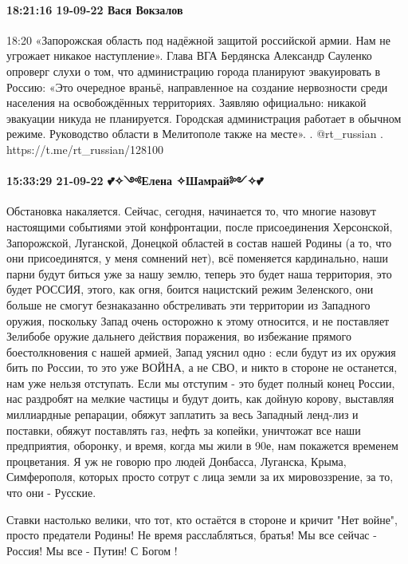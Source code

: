 \paragraph{18:21:16 19-09-22 Вася Вокзалов}
18:20
«Запорожская область под надёжной защитой российской армии. Нам не угрожает никакое наступление».
Глава ВГА Бердянска Александр Сауленко опроверг слухи о том, что администрацию города планируют эвакуировать в Россию:
«Это очередное враньё, направленное на создание нервозности среди населения на освобождённых территориях. Заявляю официально: никакой эвакуации никуда не планируется. Городская администрация работает в обычном режиме. Руководство области в Мелитополе также на месте».
.
@rt_russian
.
https://t.me/rt_russian/128100


\paragraph{15:33:29 21-09-22 💕✧༺Елена ✧Шамрай༻✧💕}

Обстановка накаляется. Сейчас, сегодня, начинается то, что многие назовут
настоящими событиями этой конфронтации, после присоединения Херсонской,
Запорожской, Луганской, Донецкой областей в состав нашей Родины (а то, что они
присоединятся, у меня сомнений нет), всё поменяется кардинально, наши парни
будут биться уже за нашу землю, теперь это будет наша территория, это будет
РОССИЯ, этого, как огня, боится нацистский режим Зеленского, они больше не
смогут безнаказанно обстреливать эти территории из Западного оружия, поскольку
Запад очень осторожно к этому относится, и не поставляет Зелибобе оружие
дальнего действия поражения, во избежание прямого боестолкновения с нашей
армией, Запад уяснил одно : если будут из их оружия бить по России, то это уже
ВОЙНА, а не СВО, и никто в стороне не останется, нам уже нельзя отступать. Если
мы отступим - это будет полный конец России, нас раздробят на мелкие частицы и
будут доить, как дойную корову, выставляя миллиардные репарации, обяжут
заплатить за весь Западный ленд-лиз и поставки, обяжут поставлять газ, нефть за
копейки, уничтожат все наши предприятия, оборонку, и время, когда мы жили в
90е, нам покажется временем процветания. Я уж не говорю про людей Донбасса,
Луганска, Крыма, Симферополя, которых просто сотрут с лица земли за их
мировоззрение, за то, что они - Русские.

Ставки настолько велики, что тот, кто остаётся в стороне и кричит "Нет войне",
просто предатели Родины! Не время расслабляться, братья! Мы все сейчас -
Россия! Мы все - Путин! С Богом !

